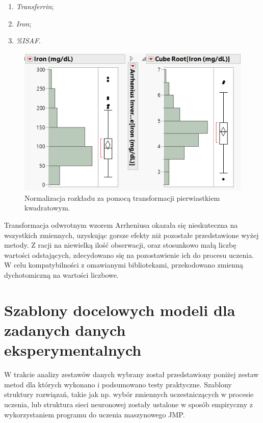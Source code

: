 	\begin{enumerate}
		\item \textit{Transferrin};
		\item \textit{Iron};
		\item \textit{\%ISAF}.
	\end{enumerate}

	\begin{figure}
		\centering
		\includegraphics[width=0.7\linewidth]{Rozdzial3/cube2}
		\caption{Normalizacja rozkładu za pomocą transformacji pierwiastkiem kwadratowym.}
		\label{fig:cube2}
	\end{figure}

	Transformacja odwrotnym wzorem Arrheniusa okazała się nieskuteczna na wszystkich zmiennych, uzyskując gorsze efekty niż pozostałe przedstawione wyżej metody. Z racji na niewielką ilość obserwacji, oraz stosunkowo małą liczbę wartości odstających, zdecydowano się na pozostawienie ich do procesu uczenia. W celu kompatybilności z omawianymi bibliotekami, przekodowano zmienną dychotomiczną na wartości liczbowe.

\section{Szablony docelowych modeli dla zadanych danych eksperymentalnych}

W trakcie analizy zestawów danych wybrany został przedstawiony poniżej zestaw metod dla których wykonano i podsumowano testy praktyczne. Szablony struktury rozwiązań, takie jak np. wybór zmiennych uczestniczących w procesie uczenia, lub struktura sieci neuronowej zostały ustalone w sposób empiryczny z wykorzystaniem programu do uczenia maszynowego JMP. 


